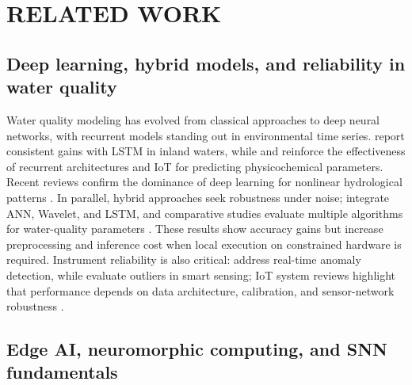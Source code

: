 \section{RELATED WORK}

\subsection{Deep learning, hybrid models, and reliability in water quality}

Water quality modeling has evolved from classical approaches to deep neural networks, with
recurrent models standing out in environmental time series.  report consistent
gains with LSTM in inland waters, while  and  reinforce the
effectiveness of recurrent architectures and IoT for predicting physicochemical parameters. Recent
reviews confirm the dominance of deep learning for nonlinear hydrological patterns
\cite{yan2024,pan2025}. In parallel, hybrid approaches seek robustness under noise;
 integrate ANN, Wavelet, and LSTM, and comparative studies evaluate multiple
algorithms for water-quality parameters \cite{ahmed2019,kalaivanan2022,aladhaileh2021}. These results
show accuracy gains but increase preprocessing and inference cost when local execution on constrained
hardware is required. Instrument reliability is also critical:  address
real-time anomaly detection, while  evaluate outliers in smart sensing; IoT
system reviews highlight that performance depends on data architecture, calibration, and sensor-network
robustness \cite{zulkifli2022,miller2025}.

\subsection{Edge AI, neuromorphic computing, and SNN fundamentals}

